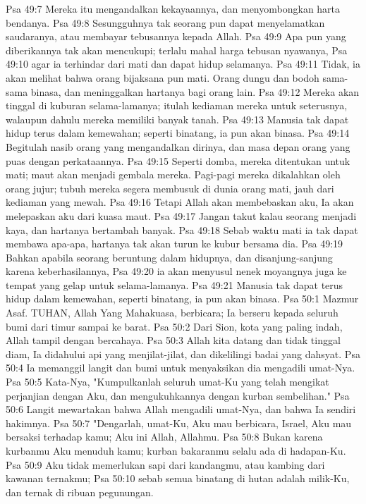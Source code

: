 Psa 49:7  Mereka itu mengandalkan kekayaannya, dan menyombongkan harta bendanya.
Psa 49:8  Sesungguhnya tak seorang pun dapat menyelamatkan saudaranya, atau membayar tebusannya kepada Allah.
Psa 49:9  Apa pun yang diberikannya tak akan mencukupi; terlalu mahal harga tebusan nyawanya,
Psa 49:10  agar ia terhindar dari mati dan dapat hidup selamanya.
Psa 49:11  Tidak, ia akan melihat bahwa orang bijaksana pun mati. Orang dungu dan bodoh sama-sama binasa, dan meninggalkan hartanya bagi orang lain.
Psa 49:12  Mereka akan tinggal di kuburan selama-lamanya; itulah kediaman mereka untuk seterusnya, walaupun dahulu mereka memiliki banyak tanah.
Psa 49:13  Manusia tak dapat hidup terus dalam kemewahan; seperti binatang, ia pun akan binasa.
Psa 49:14  Begitulah nasib orang yang mengandalkan dirinya, dan masa depan orang yang puas dengan perkataannya.
Psa 49:15  Seperti domba, mereka ditentukan untuk mati; maut akan menjadi gembala mereka. Pagi-pagi mereka dikalahkan oleh orang jujur; tubuh mereka segera membusuk di dunia orang mati, jauh dari kediaman yang mewah.
Psa 49:16  Tetapi Allah akan membebaskan aku, Ia akan melepaskan aku dari kuasa maut.
Psa 49:17  Jangan takut kalau seorang menjadi kaya, dan hartanya bertambah banyak.
Psa 49:18  Sebab waktu mati ia tak dapat membawa apa-apa, hartanya tak akan turun ke kubur bersama dia.
Psa 49:19  Bahkan apabila seorang beruntung dalam hidupnya, dan disanjung-sanjung karena keberhasilannya,
Psa 49:20  ia akan menyusul nenek moyangnya juga ke tempat yang gelap untuk selama-lamanya.
Psa 49:21  Manusia tak dapat terus hidup dalam kemewahan, seperti binatang, ia pun akan binasa.
Psa 50:1  Mazmur Asaf. TUHAN, Allah Yang Mahakuasa, berbicara; Ia berseru kepada seluruh bumi dari timur sampai ke barat.
Psa 50:2  Dari Sion, kota yang paling indah, Allah tampil dengan bercahaya.
Psa 50:3  Allah kita datang dan tidak tinggal diam, Ia didahului api yang menjilat-jilat, dan dikelilingi badai yang dahsyat.
Psa 50:4  Ia memanggil langit dan bumi untuk menyaksikan dia mengadili umat-Nya.
Psa 50:5  Kata-Nya, "Kumpulkanlah seluruh umat-Ku yang telah mengikat perjanjian dengan Aku, dan mengukuhkannya dengan kurban sembelihan."
Psa 50:6  Langit mewartakan bahwa Allah mengadili umat-Nya, dan bahwa Ia sendiri hakimnya.
Psa 50:7  "Dengarlah, umat-Ku, Aku mau berbicara, Israel, Aku mau bersaksi terhadap kamu; Aku ini Allah, Allahmu.
Psa 50:8  Bukan karena kurbanmu Aku menuduh kamu; kurban bakaranmu selalu ada di hadapan-Ku.
Psa 50:9  Aku tidak memerlukan sapi dari kandangmu, atau kambing dari kawanan ternakmu;
Psa 50:10  sebab semua binatang di hutan adalah milik-Ku, dan ternak di ribuan pegunungan.
